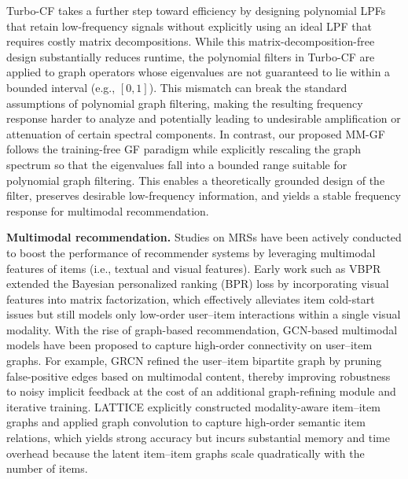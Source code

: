 \documentclass[a4paper,fleqn]{cas-sc}
\renewcommand{\cite}{\citep}
\begin{document}
Turbo-CF \cite{DBLP:conf/sigir/ParkSS24} takes a further step toward efficiency by designing polynomial LPFs that retain low-frequency signals without explicitly using an ideal LPF that requires costly matrix decompositions. While this matrix-decomposition-free design substantially reduces runtime, the polynomial filters in Turbo-CF are applied to graph operators whose eigenvalues are not guaranteed to lie within a bounded interval (e.g., $[0,1]$). This mismatch can break the standard assumptions of polynomial graph filtering, making the resulting frequency response harder to analyze and potentially leading to undesirable amplification or attenuation of certain spectral components. In contrast, our proposed \textsf{MM-GF} follows the training-free GF paradigm while explicitly rescaling the graph spectrum so that the eigenvalues fall into a bounded range suitable for polynomial graph filtering. This enables a theoretically grounded design of the filter, preserves desirable low-frequency information, and yields a stable frequency response for multimodal recommendation.


\textbf{Multimodal recommendation.}
Studies on MRSs have been actively conducted to boost the performance of recommender systems by leveraging multimodal features of items (i.e., textual and visual features). Early work such as VBPR \cite{DBLP:conf/aaai/HeM16} extended the Bayesian personalized ranking (BPR) loss \cite{DBLP:journals/corr/abs-1205-2618} by incorporating visual features into matrix factorization, which effectively alleviates item cold-start issues but still models only low-order user–item interactions within a single visual modality. With the rise of graph-based recommendation, GCN-based multimodal models have been proposed to capture high-order connectivity on user–item graphs. For example, GRCN \cite{DBLP:conf/mm/WeiWN0C20} refined the user–item bipartite graph by pruning false-positive edges based on multimodal content, thereby improving robustness to noisy implicit feedback at the cost of an additional graph-refining module and iterative training. LATTICE \cite{DBLP:conf/mm/Zhang00WWW21} explicitly constructed modality-aware item–item graphs and applied graph convolution to capture high-order semantic item relations, which yields strong accuracy but incurs substantial memory and time overhead because the latent item–item graphs scale quadratically with the number of items.
\end{document}
